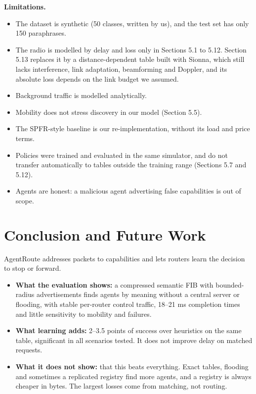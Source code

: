 \documentclass[journal]{IEEEtran}
\begin{document}
\textbf{Limitations.}

\begin{itemize}
\item The dataset is synthetic (50 classes, written by us), and the test set has only 150 paraphrases.
\item The radio is modelled by delay and loss only in Sections 5.1 to 5.12. Section 5.13 replaces it by a distance-dependent table built with Sionna, which still lacks interference, link adaptation, beamforming and Doppler, and its absolute loss depends on the link budget we assumed.
\item Background traffic is modelled analytically.
\item Mobility does not stress discovery in our model (Section 5.5).
\item The SPFR-style baseline is our re-implementation, without its load and price terms.
\item Policies were trained and evaluated in the same simulator, and do not transfer automatically to tables outside the training range (Sections 5.7 and 5.12).
\item Agents are honest: a malicious agent advertising false capabilities is out of scope.
\end{itemize}

\section{Conclusion and Future Work}
AgentRoute addresses packets to capabilities and lets routers learn the decision to stop or forward.

\begin{itemize}
\item \textbf{What the evaluation shows:} a compressed semantic FIB with bounded-radius advertisements finds agents by meaning without a central server or flooding, with stable per-router control traffic, 18--21 ms completion times and little sensitivity to mobility and failures.
\item \textbf{What learning adds:} 2--3.5 points of success over heuristics on the same table, significant in all scenarios tested. It does not improve delay on matched requests.
\item \textbf{What it does not show:} that this beats everything. Exact tables, flooding and sometimes a replicated registry find more agents, and a registry is always cheaper in bytes. The largest losses come from matching, not routing.
\end{itemize}
\end{document}
